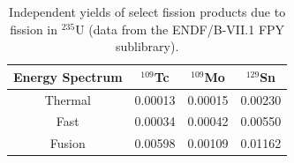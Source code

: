 \documentclass[3p,authoryear]{elsarticle}
\begin{document}
\begin{table}[htbp]
  \centering
  \caption{Independent yields of select fission products due to fission in
  $^{235}$U (data from the ENDF/B-VII.1 FPY sublibrary).}
  \label{tab:fp-yields}
  \begin{tabular}{cccc}
    \toprule
    \textbf{Energy Spectrum} & \textbf{$^{109}$Tc} & \textbf{$^{109}$Mo} & \textbf{$^{129}$Sn} \\
    \midrule
    Thermal & 0.00013 & 0.00015 & 0.00230 \\
    Fast & 0.00034 & 0.00042 & 0.00550 \\
    Fusion & 0.00598 & 0.00109 & 0.01162 \\
    \bottomrule
  \end{tabular}
\end{table}
\end{document}
